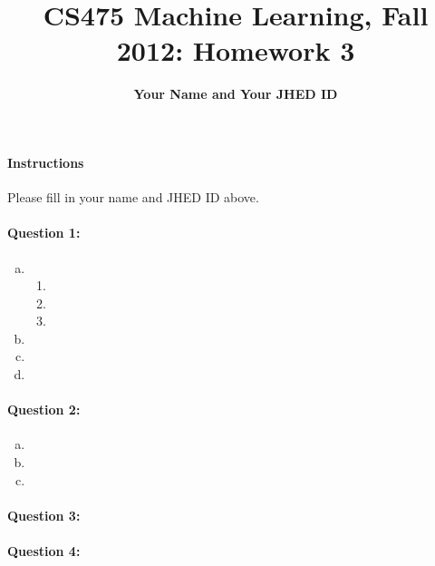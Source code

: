 \documentclass[letterpaper,11pt]{article}
\title{CS475 Machine Learning, Fall 2012: Homework 3}
\date{}
\author{\bf Your Name and Your JHED ID}
\begin{document}
\maketitle

\paragraph*{Instructions} Please fill in your name and JHED ID above.

\paragraph{Question 1:}
\begin{enumerate}[(a)]
\item \begin{enumerate}[(1)]
\item
\item
\item
\end{enumerate}
\item
\item
\item
\end{enumerate}

\paragraph{Question 2:}
\begin{enumerate}[(a)]
\item
\item
\item
\end{enumerate}

\paragraph{Question 3:}

\paragraph{Question 4:}
\end{document}
